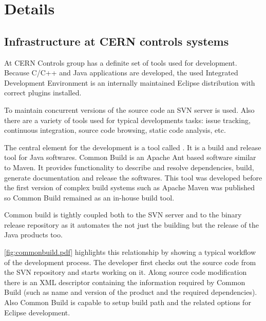 \chapter{Details}


\section{Infrastructure at CERN controls systems}

At CERN Controls group has a definite set of tools used for development. Because
C/C++ and Java applications are developed, the used Integrated Development
Environment is an internally maintained Eclipse distribution with correct
plugins installed.

To maintain concurrent versions of the source code an SVN server is used. Also
there are a variety of tools used for typical developments tasks: issue
tracking, continuous integration, source code browsing, static code analysis,
etc. 

The central element for the development is a tool called 
\cite{CommonBuild}. It is a build and release tool for Java softwares. Common
Build is an Apache Ant based software similar to Maven. It provides
functionality to describe and resolve dependencies, build, generate
documentation and release the softwares. This tool was developed before the
first version of complex build systems such as Apache Maven was published so 
Common Build remained as an in-house build tool. 

Common build is tightly coupled both to the SVN server and to the binary release
repository as it automates the not just the building but the release of the
Java products too.

\autoref{fig:commonbuild.pdf} highlights this relationship by showing a typical
workflow of the development process. The developer first checks out the source
code from the SVN repository and starts working on it. Along source code
modification there is an XML descriptor containing the information required by
Common Build (such as name and version of the product and the required
dependencies). Also Common Build is capable to setup build path and the related
options for Eclipse development. 

